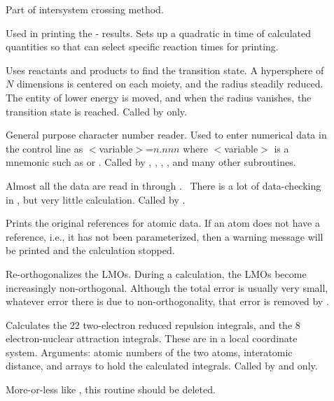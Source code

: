 \begin{description}
\item[] Part of intersystem crossing method.

\item[] Used in printing the  -  results.  Sets
up a quadratic in time of calculated quantities so that   can
select specific reaction times for printing.

\item[] Uses reactants and products to find the  transition
state. A hypersphere of $N$ dimensions is centered on  each moiety, and the
radius steadily reduced. The entity of  lower energy is moved, and when the
radius vanishes, the  transition state is reached. Called by 
only.

\item[] General purpose character number reader. Used to enter
numerical data in the control line as $<$variable$>$=$n.nnn$ where
$<$variable$>$ is a mnemonic such as  or .  Called by
, , , , and  many other
subroutines.

\item[] Almost all the data are read in through .  \
There is a lot of data-checking in , but very little  calculation.
Called by \comp{MOPAC}.

\item[] Prints the original references for atomic data. If an atom
does not have a reference, i.e., it has not been parameterized, then a warning
message will be printed and the calculation stopped.

\item[] Re-orthogonalizes the LMOs.  During a calculation, the
LMOs become increasingly non-orthogonal.  Although the total error is usually
very small, whatever error there is due to non-orthogonality, that error is
removed by \comp{REORTH}.

\item[] Calculates the 22 two-electron reduced repulsion  integrals,
and the 8 electron-nuclear attraction integrals. These are in a local
coordinate system. Arguments: atomic numbers of the two atoms, interatomic
distance, and arrays to  hold the calculated integrals. Called by 
and \comp{OUTER2} only.

\item[] More-or-less like , this routine should be
deleted.


\end{description}
